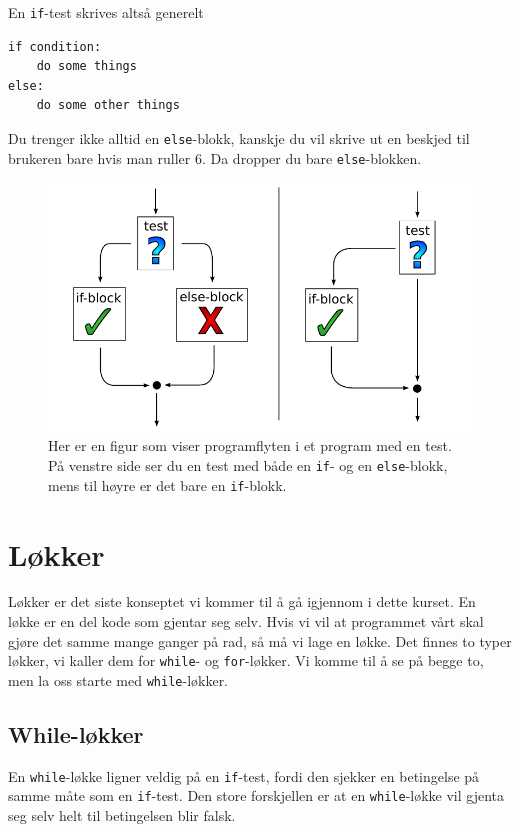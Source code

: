 \documentclass[a4paper, 11pt, notitlepage]{article}
\begin{document}
En \verb+if+-test skrives altså generelt
\begin{lstlisting}
if condition:
	do some things
else:
	do some other things
\end{lstlisting}
Du trenger ikke alltid en \verb+else+-blokk, kanskje du vil skrive ut en beskjed til brukeren bare hvis man ruller 6. Da dropper du bare \verb+else+-blokken. 

\begin{figure}[tpb]
	\centering
	\includegraphics[width=\textwidth]{fig/if_else}
	\caption{Her er en figur som viser programflyten i et program med en test. På venstre side ser du en test med både en \texttt{if}- og en \texttt{else}-blokk, mens til høyre er det bare en \texttt{if}-blokk.}
\end{figure}

\clearpage
\section*{Løkker}

Løkker er det siste konseptet vi kommer til å gå igjennom i dette kurset. En løkke er en del kode som gjentar seg selv. Hvis vi vil at programmet vårt skal gjøre det samme mange ganger på rad, så må vi lage en løkke. Det finnes to typer løkker, vi kaller dem for \verb+while+- og \verb+for+-løkker. Vi komme til å se på begge to, men la oss starte med \verb+while+-løkker.

\subsection*{While-løkker}

En \verb+while+-løkke ligner veldig på en \verb+if+-test, fordi den sjekker en betingelse på samme måte som en \verb+if+-test. Den store forskjellen er at en \verb+while+-løkke vil gjenta seg selv helt til betingelsen blir falsk.
\end{document}
